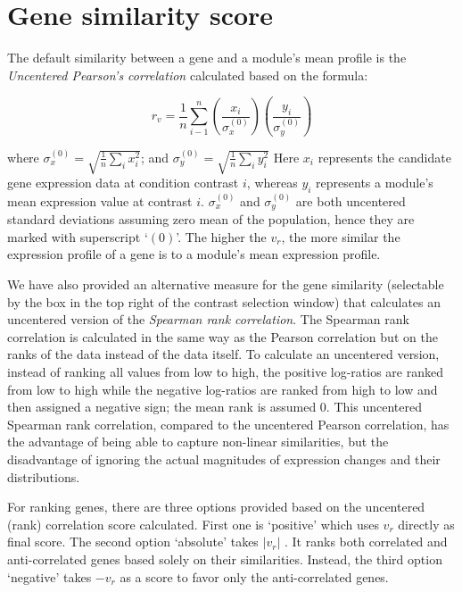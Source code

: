 \section{Gene similarity score}\label{apd:gene-score}

The default similarity between a gene and a module's mean profile is the \textit{Uncentered Pearson’s correlation} calculated based on the formula:

\begin{equation}
r_v=\frac{1}{n}\sum_{i-1}^n(\dfrac{x_i}{\sigma_x^{(0)}})(\dfrac{y_i}{\sigma_y^{(0)}})
\end{equation}

where $\textstyle\sigma_x^{(0)}=\sqrt{\frac{1}{n}\sum\limits_{i}x_i^2}$; and $\textstyle\sigma_y^{(0)}=\sqrt{\frac{1}{n}\sum\limits_{i}y_i^2}$ Here $x_i$ represents the candidate gene expression data at condition contrast $i$, whereas $y_i$ represents a module’s mean expression value at contrast $i$. $\sigma_x^{(0)}$ and $\sigma_y^{(0)}$ are both uncentered standard deviations assuming zero mean of the population, hence they are marked with superscript ‘$(0)$’. The higher the $v_r$, the more similar the expression profile of a gene is to a module’s mean expression profile.

We have also provided an alternative measure for the gene similarity (selectable by the box in the top right of the contrast selection window) that calculates an uncentered version of the \textit{Spearman rank correlation}. The Spearman rank correlation is calculated in the same way as the Pearson correlation but on the ranks of the data instead of the data itself. To calculate an uncentered version, instead of ranking all values from low to high, the positive log-ratios are ranked from low to high while the negative log-ratios are ranked from high to low and then assigned a negative sign; the mean rank is assumed $0$.  This uncentered Spearman rank correlation, compared to the uncentered Pearson correlation, has the advantage of being able to capture non-linear similarities, but the disadvantage of ignoring the actual magnitudes of expression changes and their distributions.

For ranking genes, there are three options provided based on the uncentered (rank) correlation score calculated. First one is ‘positive’ which uses $v_r$ directly as final score.  The second option ‘absolute’ takes $|v_r|$ . It ranks both correlated and anti-correlated genes based solely on their similarities. Instead,  the third option ‘negative’ takes $-v_r$ as a score to favor only  the anti-correlated genes.



